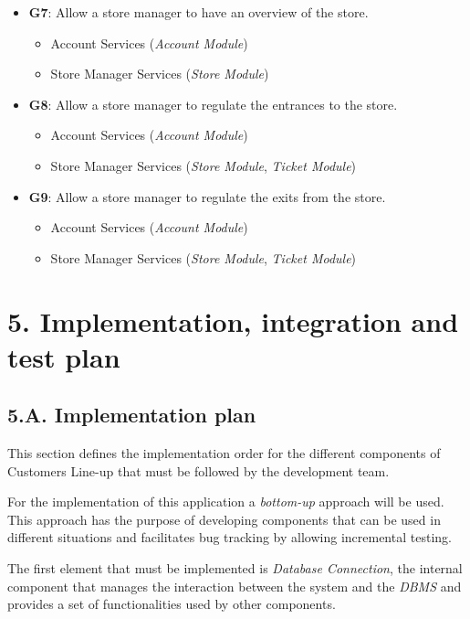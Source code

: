 \begin{itemize}
\begin{itemize}
    \end{itemize}
\item \textbf{G7}: Allow a store manager to have an overview of the store.
    \begin{itemize}
        \item Account Services (\emph{Account Module})
        \item Store Manager Services (\emph{Store Module})
    \end{itemize}
\item \textbf{G8}: Allow a store manager to regulate the entrances to the store.
    \begin{itemize}
        \item Account Services (\emph{Account Module})
        \item Store Manager Services (\emph{Store Module}, \emph{Ticket Module})
    \end{itemize}
\item \textbf{G9}: Allow a store manager to regulate the exits from the store.
    \begin{itemize}
        \item Account Services (\emph{Account Module})
        \item Store Manager Services (\emph{Store Module}, \emph{Ticket Module})
    \end{itemize}
\end{itemize}

\chapter{5. Implementation, integration and test plan}

\section{5.A. Implementation plan}

This section defines the implementation order for the different components of Customers Line-up that must be followed by the development team.

For the implementation of this application a \emph{bottom-up} approach will be used. This approach has the purpose of developing components that can be used in different situations and facilitates bug tracking by allowing incremental testing.

The first element that must be implemented is \emph{Database Connection}, the internal component that manages the interaction between the system and the \emph{DBMS} and provides a set of functionalities used by other components.


